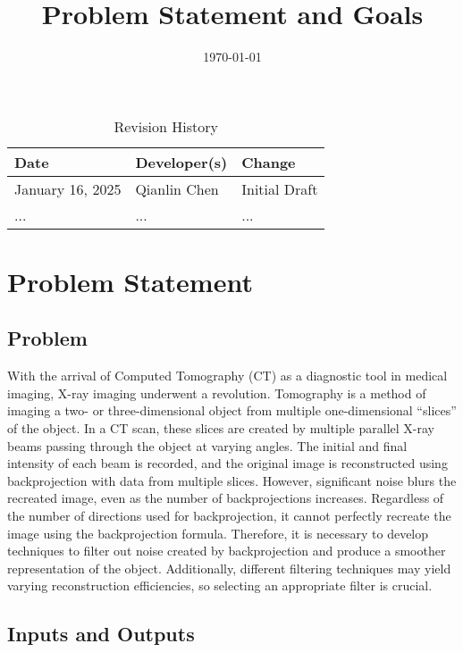 \documentclass{article}
\title{Problem Statement and Goals\\\progname}
\author{\authname}
\date{\today}
\begin{document}
\maketitle

\begin{table}[hp]
\caption{Revision History} \label{TblRevisionHistory}
\begin{tabularx}{\textwidth}{llX}
\toprule
\textbf{Date} & \textbf{Developer(s)} & \textbf{Change}\\
\midrule
  January 16, 2025 & Qianlin Chen & Initial Draft \\
\midrule
  ... & ... & ...\\
\bottomrule
\end{tabularx}
\end{table}

\section{Problem Statement}

\subsection{Problem}
With the arrival of Computed Tomography (CT) as a diagnostic tool in medical
imaging, X-ray imaging underwent a revolution. Tomography is a method of imaging
a two- or three-dimensional object from multiple one-dimensional ``slices'' of
the object. In a CT scan, these slices are created by multiple parallel X-ray
beams passing through the object at varying angles. The initial and final
intensity of each beam is recorded, and the original image is reconstructed
using backprojection with data from multiple slices.
\newline However, significant noise blurs the recreated image, even as the number of
backprojections increases. Regardless of the number of directions used for
backprojection, it cannot perfectly recreate the image using the backprojection
formula. Therefore, it is necessary to develop techniques to filter out noise
created by backprojection and produce a smoother representation of the object.
Additionally, different filtering techniques may yield varying reconstruction
efficiencies, so selecting an appropriate filter is crucial.

\subsection{Inputs and Outputs}
\end{document}
